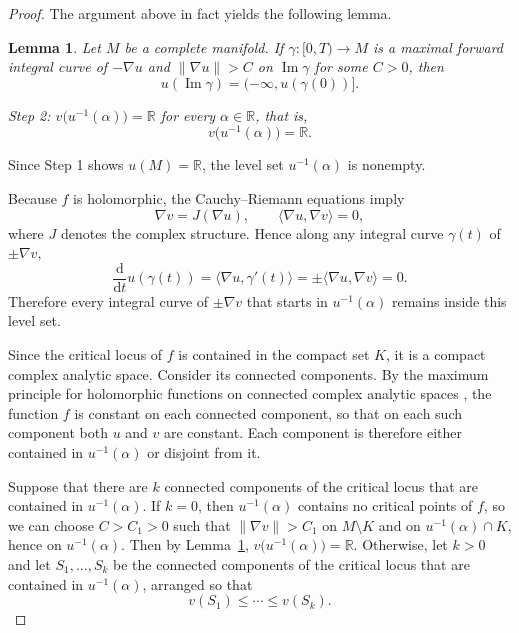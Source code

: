 \documentclass[11pt]{amsart}
\theoremstyle{plain}
\newtheorem{lemma}[theorem]{Lemma}
\theoremstyle{definition}
\theoremstyle{remark}
\numberwithin{equation}{section}
\begin{document}
\begin{proof}
    The argument above in fact yields the following lemma.

    \begin{lemma}\label{lem:integral-curve}
        Let $M$ be a complete manifold.
        If $\gamma : [0, T) \to M$ is a maximal forward integral curve of $-\nabla u$ and $\|\nabla u\| > C$ on $\operatorname{Im} \gamma$ for some $C > 0$, then
        \begin{equation}
            u(\operatorname{Im} \gamma) = (-\infty, u(\gamma(0))].
        \end{equation}
    \end{lemma}

    \medskip
    \noindent\emph{Step 2: $v\big(u^{-1}(\alpha)\big) = \mathbb{R}$ for every $\alpha \in \mathbb{R}$, that is,}
    \begin{equation}
        v\big(u^{-1}(\alpha)\big) = \mathbb{R}.
    \end{equation}

    Since Step 1 shows $u(M) = \mathbb{R}$, the level set $u^{-1}(\alpha)$ is nonempty.

    Because $f$ is holomorphic, the Cauchy--Riemann equations imply
    \begin{equation}
        \nabla v = J(\nabla u), \qquad \langle \nabla u, \nabla v \rangle = 0,
    \end{equation}
    where $J$ denotes the complex structure.
    Hence along any integral curve $\gamma(t)$ of $\pm \nabla v$,
    \begin{equation}
        \frac{\mathrm{d}}{\mathrm{d}t} u(\gamma(t)) = \langle \nabla u, \gamma'(t) \rangle = \pm \langle \nabla u, \nabla v \rangle = 0.
    \end{equation}
    Therefore every integral curve of $\pm \nabla v$ that starts in $u^{-1}(\alpha)$ remains inside this level set.

    Since the critical locus of $f$ is contained in the compact set $K$, it is a compact complex analytic space.
    Consider its connected components.
    By the maximum principle for holomorphic functions on connected complex analytic spaces \cite[Chapter 5, Section 5]{GrauertRemmert2004}, the function $f$ is constant on each connected component, so that on each such component both $u$ and $v$ are constant.
    Each component is therefore either contained in $u^{-1}(\alpha)$ or disjoint from it.

    Suppose that there are $k$ connected components of the critical locus that are contained in $u^{-1}(\alpha)$.
    If $k = 0$, then $u^{-1}(\alpha)$ contains no critical points of $f$, so we can choose $C > C_1 > 0$ such that $\|\nabla v\| > C_1$ on $M\setminus K$ and on $u^{-1}(\alpha)\cap K$, hence on $u^{-1}(\alpha)$.
    Then by Lemma~\ref{lem:integral-curve}, $v\big(u^{-1}(\alpha)\big) = \mathbb{R}$.
    Otherwise, let $k>0$ and let $S_1, \ldots, S_k$ be the connected components of the critical locus that are contained in $u^{-1}(\alpha)$, arranged so that
    \begin{equation}
        v(S_1) \leq \cdots \leq v(S_k).
    \end{equation}


\end{proof}
\end{document}
